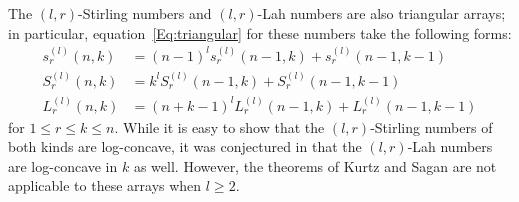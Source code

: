 \documentclass{article}
\newcommand{\SSS}{\mathfrak{S}}
\DeclareMathOperator{\cl}{cl}
\DeclareMathOperator{\bl}{bl}
\theoremstyle{definition}
\numberwithin{equation}{section}
\begin{document}

The $(l,r)$-Stirling numbers and $(l,r)$-Lah numbers are also triangular arrays; in particular, equation~\eqref{Eq:triangular} for these numbers take the following forms:
\begin{align*}
    s_r^{(l)}(n,k) &= (n-1)^l s_r^{(l)}(n-1,k) + s_r^{(l)}(n-1,k-1)\\
    S_r^{(l)}(n,k) &= k^l S_r^{(l)}(n-1,k) + S_r^{(l)}(n-1,k-1)\\
    L_r^{(l)}(n,k) &= (n+k-1)^l L_r^{(l)}(n-1,k) + L_r^{(l)}(n-1,k-1)
\end{align*}
for $1 \leq r \leq k \leq n$.
While it is easy to show that the $(l,r)$-Stirling numbers of both kinds are log-concave, it was conjectured in \cite{aleks-gen-lah} that the $(l,r)$-Lah numbers are log-concave in $k$ as well. However, the theorems of Kurtz and Sagan are not applicable to these arrays when $l\ge 2$. 
\end{document}
